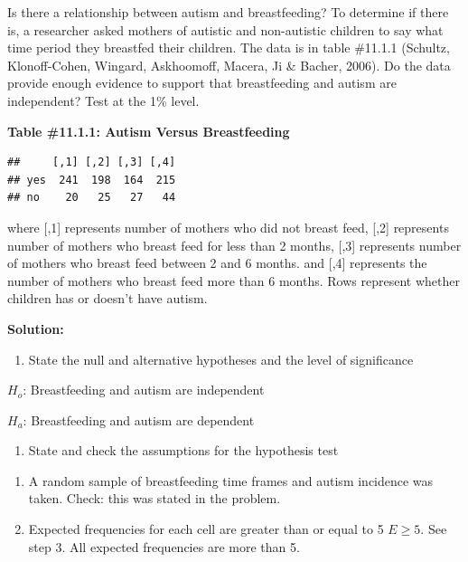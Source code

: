 \documentclass[]{book}
\providecommand{\tightlist}{%
  \setlength{\itemsep}{0pt}\setlength{\parskip}{0pt}}
\begin{document}
Is there a relationship between autism and breastfeeding? To determine if there is, a researcher asked mothers of autistic and non-autistic children to say what time period they breastfed their children. The data is in table \#11.1.1 (Schultz, Klonoff-Cohen, Wingard, Askhoomoff, Macera, Ji \& Bacher, 2006). Do the data provide enough evidence to support that breastfeeding and autism are independent? Test at the 1\% level.

\textbf{Table \#11.1.1: Autism Versus Breastfeeding}

\begin{verbatim}
##     [,1] [,2] [,3] [,4]
## yes  241  198  164  215
## no    20   25   27   44
\end{verbatim}

where {[},1{]} represents number of mothers who did not breast feed, {[},2{]} represents number of mothers who breast feed for less than 2 months, {[},3{]} represents number of mothers who breast feed between 2 and 6 months. and {[},4{]} represents the number of mothers who breast feed more than 6 months. Rows represent whether children has or doesn't have autism.

\textbf{Solution:}

\begin{enumerate}
\def\labelenumi{\arabic{enumi}.}
\tightlist
\item
  State the null and alternative hypotheses and the level of significance
\end{enumerate}

\(H_o\): Breastfeeding and autism are independent

\(H_a\): Breastfeeding and autism are dependent

\begin{enumerate}
\def\labelenumi{\arabic{enumi}.}
\setcounter{enumi}{1}
\tightlist
\item
  State and check the assumptions for the hypothesis test
\end{enumerate}

\begin{enumerate}
\def\labelenumi{\alph{enumi}.}
\item
  A random sample of breastfeeding time frames and autism incidence was taken. Check: this was stated in the problem.
\item
  Expected frequencies for each cell are greater than or equal to 5 \(E\ge 5\). See step 3. All expected frequencies are more than 5.
\end{enumerate}
\end{document}

